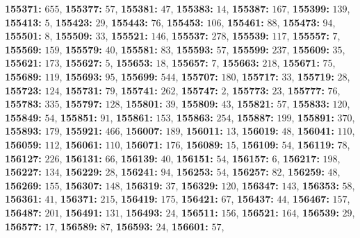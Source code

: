 \textsf{\bfseries 155371:} $655$, \textsf{\bfseries 155377:} $57$, \textsf{\bfseries 155381:} $47$, \textsf{\bfseries 155383:} $14$, \textsf{\bfseries 155387:} $167$, \textsf{\bfseries 155399:} $139$, \textsf{\bfseries 155413:} $5$, \textsf{\bfseries 155423:} $29$, \textsf{\bfseries 155443:} $76$, \textsf{\bfseries 155453:} $106$, \textsf{\bfseries 155461:} $88$, \textsf{\bfseries 155473:} $94$, \textsf{\bfseries 155501:} $8$, \textsf{\bfseries 155509:} $33$, \textsf{\bfseries 155521:} $146$, \textsf{\bfseries 155537:} $278$, \textsf{\bfseries 155539:} $117$, \textsf{\bfseries 155557:} $7$, \textsf{\bfseries 155569:} $159$, \textsf{\bfseries 155579:} $40$, \textsf{\bfseries 155581:} $83$, \textsf{\bfseries 155593:} $57$, \textsf{\bfseries 155599:} $237$, \textsf{\bfseries 155609:} $35$, \textsf{\bfseries 155621:} $173$, \textsf{\bfseries 155627:} $5$, \textsf{\bfseries 155653:} $18$, \textsf{\bfseries 155657:} $7$, \textsf{\bfseries 155663:} $218$, \textsf{\bfseries 155671:} $75$, \textsf{\bfseries 155689:} $119$, \textsf{\bfseries 155693:} $95$, \textsf{\bfseries 155699:} $544$, \textsf{\bfseries 155707:} $180$, \textsf{\bfseries 155717:} $33$, \textsf{\bfseries 155719:} $28$, \textsf{\bfseries 155723:} $124$, \textsf{\bfseries 155731:} $79$, \textsf{\bfseries 155741:} $262$, \textsf{\bfseries 155747:} $2$, \textsf{\bfseries 155773:} $23$, \textsf{\bfseries 155777:} $76$, \textsf{\bfseries 155783:} $335$, \textsf{\bfseries 155797:} $128$, \textsf{\bfseries 155801:} $39$, \textsf{\bfseries 155809:} $43$, \textsf{\bfseries 155821:} $57$, \textsf{\bfseries 155833:} $120$, \textsf{\bfseries 155849:} $54$, \textsf{\bfseries 155851:} $91$, \textsf{\bfseries 155861:} $153$, \textsf{\bfseries 155863:} $254$, \textsf{\bfseries 155887:} $199$, \textsf{\bfseries 155891:} $370$, \textsf{\bfseries 155893:} $179$, \textsf{\bfseries 155921:} $466$, \textsf{\bfseries 156007:} $189$, \textsf{\bfseries 156011:} $13$, \textsf{\bfseries 156019:} $48$, \textsf{\bfseries 156041:} $110$, \textsf{\bfseries 156059:} $112$, \textsf{\bfseries 156061:} $110$, \textsf{\bfseries 156071:} $176$, \textsf{\bfseries 156089:} $15$, \textsf{\bfseries 156109:} $54$, \textsf{\bfseries 156119:} $78$, \textsf{\bfseries 156127:} $226$, \textsf{\bfseries 156131:} $66$, \textsf{\bfseries 156139:} $40$, \textsf{\bfseries 156151:} $54$, \textsf{\bfseries 156157:} $6$, \textsf{\bfseries 156217:} $198$, \textsf{\bfseries 156227:} $134$, \textsf{\bfseries 156229:} $28$, \textsf{\bfseries 156241:} $94$, \textsf{\bfseries 156253:} $54$, \textsf{\bfseries 156257:} $82$, \textsf{\bfseries 156259:} $48$, \textsf{\bfseries 156269:} $155$, \textsf{\bfseries 156307:} $148$, \textsf{\bfseries 156319:} $37$, \textsf{\bfseries 156329:} $120$, \textsf{\bfseries 156347:} $143$, \textsf{\bfseries 156353:} $58$, \textsf{\bfseries 156361:} $41$, \textsf{\bfseries 156371:} $215$, \textsf{\bfseries 156419:} $175$, \textsf{\bfseries 156421:} $67$, \textsf{\bfseries 156437:} $44$, \textsf{\bfseries 156467:} $157$, \textsf{\bfseries 156487:} $201$, \textsf{\bfseries 156491:} $131$, \textsf{\bfseries 156493:} $24$, \textsf{\bfseries 156511:} $156$, \textsf{\bfseries 156521:} $164$, \textsf{\bfseries 156539:} $29$, \textsf{\bfseries 156577:} $17$, \textsf{\bfseries 156589:} $87$, \textsf{\bfseries 156593:} $24$, \textsf{\bfseries 156601:} $57$, 
